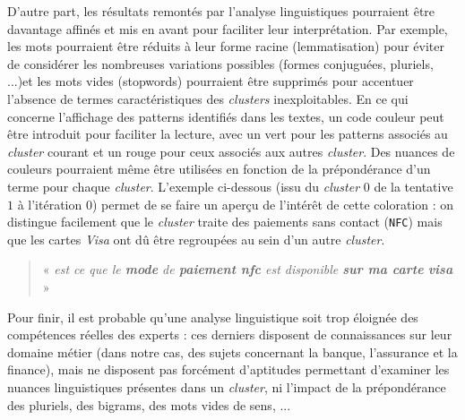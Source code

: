 			D'autre part, les résultats remontés par l'analyse linguistiques pourraient être davantage affinés et mis en avant pour faciliter leur interprétation.
			Par exemple, les mots pourraient être réduits à leur forme racine (lemmatisation) pour éviter de considérer les nombreuses variations possibles (formes conjuguées, pluriels, ...)et les mots vides (stopwords) pourraient être supprimés pour accentuer l'absence de termes caractéristiques des \textit{clusters} inexploitables.
			En ce qui concerne l'affichage des patterns identifiés dans les textes, un code couleur peut être introduit pour faciliter la lecture, avec un vert pour les patterns associés au \textit{cluster} courant et un rouge pour ceux associés aux autres \textit{cluster}.
			Des nuances de couleurs pourraient même être utilisées en fonction de la prépondérance d'un terme pour chaque \textit{cluster}.
			L'exemple ci-dessous (issu du \textit{cluster} $0$ de la tentative $1$ à l'itération $0$) permet de se faire un aperçu de l'intérêt de cette coloration : on distingue facilement que le \textit{cluster} traite des paiements sans contact (\texttt{NFC}) mais que les cartes \textit{Visa} ont dû être regroupées au sein d'un autre \textit{cluster}.

			\begin{leftBarExamples}
				\begin{quote}
					« \textit{ est ce que le \textcolor{colorDarkPastelGreen}{\textbf{mode}} de \textcolor{colorDarkPastelGreen}{\textbf{paiement nfc}} est disponible \textcolor{colorDarkPastelGreen}{\textbf{sur ma carte}} \textcolor{colorDarkPastelRed}{\textbf{visa}} } »
				\end{quote}
			\end{leftBarExamples}
			
			Pour finir, il est probable qu'une analyse linguistique soit trop éloignée des compétences réelles des experts : ces derniers disposent de connaissances sur leur domaine métier (dans notre cas, des sujets concernant la banque, l’assurance et la finance), mais ne disposent pas forcément d'aptitudes permettant d'examiner les nuances linguistiques présentes dans un \textit{cluster}, ni l'impact de la prépondérance des pluriels, des bigrams, des mots vides de sens, ...
		
